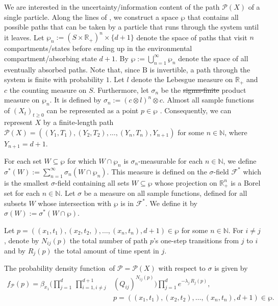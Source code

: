 \documentclass[smallextended]{svjour3}
\renewcommand{\tens}[1]{\mathrm{#1}}
\newcommand{\R}{\mathbb{R}}
\newcommand{\N}{\mathbb{N}}
\newcommand{\prodl}{\prod\limits}
\newcommand{\pdf}{probability density function}
\providecommand{\DIFaddtex}[1]{{\protect\color{blue}\uwave{#1}}} %
\providecommand{\DIFdeltex}[1]{{\protect\color{red}\sout{#1}}}                      %
\providecommand{\DIFaddbegin}{} %
\providecommand{\DIFaddend}{} %
\providecommand{\DIFdelbegin}{} %
\providecommand{\DIFdelend}{} %
\providecommand{\DIFadd}[1]{\texorpdfstring{\DIFaddtex{#1}}{#1}} %
\providecommand{\DIFdel}[1]{\texorpdfstring{\DIFdeltex{#1}}{}} %
\newcommand{\DIFscaledelfig}{0.5}
\newlength{\DIFdelgraphicswidth} %
\newlength{\DIFdelgraphicsheight} %
\newcommand{\DIFaddincludegraphics}[2][]{{\color{blue}\fbox{\DIFOincludegraphics[#1]{#2}}}} %
\newcommand{\DIFdelincludegraphics}[2][]{%
\sbox{\DIFdelgraphicsbox}{\DIFOincludegraphics[#1]{#2}}%
\settoboxwidth{\DIFdelgraphicswidth}{\DIFdelgraphicsbox} %
\settoboxtotalheight{\DIFdelgraphicsheight}{\DIFdelgraphicsbox} %
\scalebox{\DIFscaledelfig}{%
\parbox[b]{\DIFdelgraphicswidth}{\usebox{\DIFdelgraphicsbox}\\[-\baselineskip] \rule{\DIFdelgraphicswidth}{0em}}\llap{\resizebox{\DIFdelgraphicswidth}{\DIFdelgraphicsheight}{%
\setlength{\unitlength}{\DIFdelgraphicswidth}%
\begin{picture}(1,1)%
\thicklines\linethickness{2pt} %
{\color[rgb]{1,0,0}\put(0,0){\framebox(1,1){}}}%
{\color[rgb]{1,0,0}\put(0,0){\line( 1,1){1}}}%
{\color[rgb]{1,0,0}\put(0,1){\line(1,-1){1}}}%
\end{picture}%
}\hspace*{3pt}}} %
} %
\DeclareRobustCommand{\DIFaddbegin}{\DIFOaddbegin \let\includegraphics\DIFaddincludegraphics} %
\DeclareRobustCommand{\DIFaddend}{\DIFOaddend \let\includegraphics\DIFOincludegraphics} %
\DeclareRobustCommand{\DIFdelbegin}{\DIFOdelbegin \let\includegraphics\DIFdelincludegraphics} %
\DeclareRobustCommand{\DIFdelend}{\DIFOaddend \let\includegraphics\DIFOincludegraphics} %
\begin{document}
We are interested in the uncertainty/information content of the path $\mathcal{P}(X)$ of a single particle.
Along the lines of \citet{Albert1962AMS}, we construct a space $\wp$ that contains all possible paths that can be taken by a particle that runs through the system until it leaves.
Let $\wp_n:=(S\times\R_+)^n\times\{d+1\}$ denote the space of paths that visit $n$ compartments/states before ending up in the environmental compartment/absorbing state $d+1$.
By $\wp:=\bigcup_{n=1}^{\infty}\wp_n$ denote the space of all eventually absorbed paths.
Note that, since $\tens{B}$ is invertible, a path through the system is finite with probability $1$.
Let $l$ denote the Lebesgue measure on $\R_+$ and $c$ the counting measure on $S$.
Furthermore, let $\sigma_n$ be the \DIFdelbegin \DIFdel{sigma-finite }\DIFdelend \DIFaddbegin \DIFadd{$\sigma$-finite }\DIFaddend product measure on $\wp_n$.
It is defined by $\sigma_n:=(c\otimes l)^n \otimes c$.
Almost all sample functions of $(X_t)_{t\geq0}$ can be represented as a point $p\in\wp$ \citep[Chapter~VI]{Doob1953}.
Consequently, we can represent $X$ by a finite-length path $\mathcal{P}(X)=((Y_1,T_1),(Y_2,T_2),\ldots,(Y_n,T_n),Y_{n+1})$ for some $n\in\N$, where $Y_{n+1}=d+1$.

For each set $W\subseteq\wp$ for which $W\cap \wp_n$ is $\sigma_n$-measurable for each $n\in\N$, we define $\sigma^\ast(W) := \sum_{n=1}^{\infty} \sigma_n(W\cap\wp_n)$.
This measure is defined on the $\sigma$-field $\mathcal{F}^\ast$ which is the smallest $\sigma$-field containing all sets $W\subseteq\wp$ whose projection on $\R^n_+$ is a Borel set for each $n\in\N$.
Let $\sigma$ be a measure on all sample functions, defined for all subsets $W$ whose intersection with $\wp$ is in $\mathcal{F}^\ast$. 
We define it by $\sigma(W):=\sigma^*(W\cap\wp)$.

Let $p=((x_1,t_1),(x_2,t_2,),\ldots,(x_n,t_n),d+1)\in\wp$ for some $n\in\N$.
For $i\neq j$, denote by $N_{ij}(p)$ the total number of path $p$'s one-step transitions from $j$ to $i$ and by $R_j(p)$ the total amount of time spent in $j$.

\begin{mytheorem}\label{theorem:path_pdf}
	The \pdf\ of $\mathcal{P}=\mathcal{P}(X)$ with respect to $\sigma$ is given by
	\begin{equation}
    \begin{aligned}
      f_{\mathcal{P}}(p) = \beta_{x_1}\Bigg(\prodl_{j=1}^d\,\prodl_{i=1,i\neq j}^{d+1} &(Q_{ij})^{N_{ij}(p)}\Bigg)\prodl_{j=1}^d e^{-\lambda_j\,R_j(p)},\\
      & p=((x_1,t_1),(x_2,t_2),\ldots,(x_n,t_n),d+1)\in\wp.
    \end{aligned}
	\end{equation}
\end{mytheorem}
\end{document}
